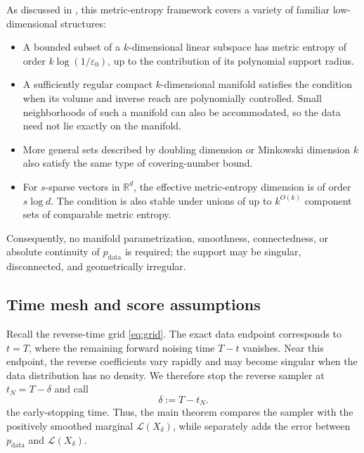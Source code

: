 \documentclass[11pt]{article}
\theoremstyle{definition}
\newcommand{\R}{\mathbb{R}}
\newcommand{\Law}{\mathcal{L}}
\newcommand{\pdata}{p_{\mathrm{data}}}
\begin{document}
As discussed in \citet[Section~4.1.1]{huang2026optimal}, this
metric-entropy framework covers a variety of familiar
low-dimensional structures:
\begin{itemize}[leftmargin=2em]
    \item A bounded subset of a $k$-dimensional linear subspace has
    metric entropy of order $k\log(1/\varepsilon_0)$, up to the
    contribution of its polynomial support radius.

    \item A sufficiently regular compact $k$-dimensional manifold
    satisfies the condition when its volume and inverse reach are
    polynomially controlled. Small neighborhoods of such a manifold
    can also be accommodated, so the data need not lie exactly on the
    manifold.

    \item More general sets described by doubling dimension or
    Minkowski dimension $k$ also satisfy the same type of
    covering-number bound.

    \item For $s$-sparse vectors in $\R^d$, the effective
    metric-entropy dimension is of order $s\log d$. The condition is
    also stable under unions of up to $k^{O(k)}$ component sets of
    comparable metric entropy.
\end{itemize}
Consequently, no manifold parametrization, smoothness, connectedness,
or absolute continuity of $\pdata$ is required; the support may be
singular, disconnected, and geometrically irregular.

\subsection{Time mesh and score assumptions}

Recall the reverse-time grid \eqref{eq:grid}. The exact data endpoint
corresponds to $t=T$, where the remaining forward noising time
$T-t$ vanishes. Near this endpoint, the reverse coefficients vary
rapidly and may become singular when the data distribution has no
density. We therefore stop the reverse sampler at
$t_N=T-\delta$ and call
\begin{equation}
    \delta:=T-t_N.
    \label{eq:delta}
\end{equation}
the early-stopping time. Thus, the main theorem compares the sampler
with the positively smoothed marginal $\Law(X_\delta)$, while
 separately adds the error between $\pdata$ and
$\Law(X_\delta)$.
\end{document}
